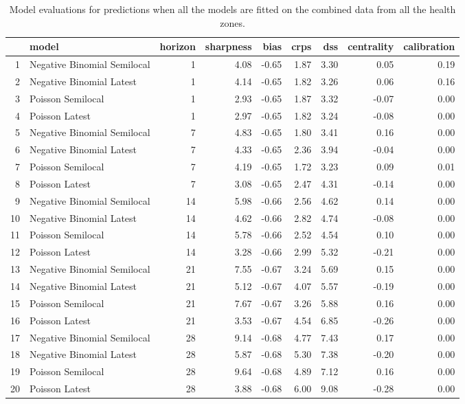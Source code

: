 \begin{table}[ht]
\centering
\begin{tabular}{rlrrrrrrr}
  \hline
 & model & horizon & sharpness & bias & crps & dss & centrality & calibration \\ 
  \hline
1 & Negative Binomial Semilocal &   1 & 4.08 & -0.65 & 1.87 & 3.30 & 0.05 & 0.19 \\ 
  2 & Negative Binomial Latest &   1 & 4.14 & -0.65 & 1.82 & 3.26 & 0.06 & 0.16 \\ 
  3 & Poisson Semilocal &   1 & 2.93 & -0.65 & 1.87 & 3.32 & -0.07 & 0.00 \\ 
  4 & Poisson Latest &   1 & 2.97 & -0.65 & 1.82 & 3.24 & -0.08 & 0.00 \\ 
  5 & Negative Binomial Semilocal &   7 & 4.83 & -0.65 & 1.80 & 3.41 & 0.16 & 0.00 \\ 
  6 & Negative Binomial Latest &   7 & 4.33 & -0.65 & 2.36 & 3.94 & -0.04 & 0.00 \\ 
  7 & Poisson Semilocal &   7 & 4.19 & -0.65 & 1.72 & 3.23 & 0.09 & 0.01 \\ 
  8 & Poisson Latest &   7 & 3.08 & -0.65 & 2.47 & 4.31 & -0.14 & 0.00 \\ 
  9 & Negative Binomial Semilocal &  14 & 5.98 & -0.66 & 2.56 & 4.62 & 0.14 & 0.00 \\ 
  10 & Negative Binomial Latest &  14 & 4.62 & -0.66 & 2.82 & 4.74 & -0.08 & 0.00 \\ 
  11 & Poisson Semilocal &  14 & 5.78 & -0.66 & 2.52 & 4.54 & 0.10 & 0.00 \\ 
  12 & Poisson Latest &  14 & 3.28 & -0.66 & 2.99 & 5.32 & -0.21 & 0.00 \\ 
  13 & Negative Binomial Semilocal &  21 & 7.55 & -0.67 & 3.24 & 5.69 & 0.15 & 0.00 \\ 
  14 & Negative Binomial Latest &  21 & 5.12 & -0.67 & 4.07 & 5.57 & -0.19 & 0.00 \\ 
  15 & Poisson Semilocal &  21 & 7.67 & -0.67 & 3.26 & 5.88 & 0.16 & 0.00 \\ 
  16 & Poisson Latest &  21 & 3.53 & -0.67 & 4.54 & 6.85 & -0.26 & 0.00 \\ 
  17 & Negative Binomial Semilocal &  28 & 9.14 & -0.68 & 4.77 & 7.43 & 0.17 & 0.00 \\ 
  18 & Negative Binomial Latest &  28 & 5.87 & -0.68 & 5.30 & 7.38 & -0.20 & 0.00 \\ 
  19 & Poisson Semilocal &  28 & 9.64 & -0.68 & 4.89 & 7.12 & 0.16 & 0.00 \\ 
  20 & Poisson Latest &  28 & 3.88 & -0.68 & 6.00 & 9.08 & -0.28 & 0.00 \\ 
   \hline
\end{tabular}
\caption{Model evaluations for predictions when all the models are fitted on the combined data from all the health zones.} 
\label{tab:nat_evo}
\end{table}
